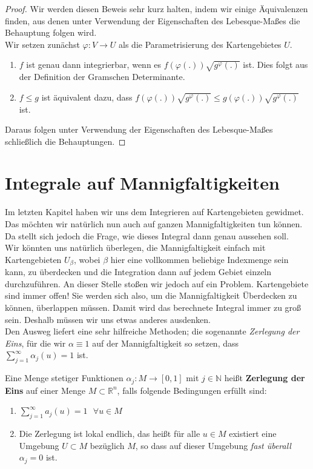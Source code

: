 \newpage
\begin{proof}
	Wir werden diesen Beweis sehr kurz halten, indem wir einige 
	Äquivalenzen finden, aus denen unter Verwendung der Eigenschaften 
	des Lebesque-Maßes die Behauptung folgen wird.\\
	Wir setzen zunächst $\varphi:V\rightarrow U$ als die Parametrisierung 
	des	Kartengebietes $U$. 
	\begin{enumerate}
		\item 	$f$ ist genau dann integrierbar, wenn es 
				$f\left(\varphi(.)\right)\sqrt{g^\varphi(.)}$ ist. 
				Dies folgt aus 	der Definition der Gramschen Determinante. 
		\item 	$f\leq g$ ist äquivalent dazu, dass 
				$f\left(\varphi(.)\right)\sqrt{g^\varphi(.)} \leq 
				g\left(\varphi(.)\right)\sqrt{g^\varphi(.)}$ ist.
	\end{enumerate}
	Daraus folgen unter Verwendung der Eigenschaften des Lebesque-Maßes 
	schließlich die Behauptungen. 
\end{proof}

\section{Integrale auf Mannigfaltigkeiten}

Im letzten Kapitel haben wir uns dem Integrieren auf Kartengebieten 
gewidmet. Das möchten wir natürlich nun auch auf ganzen Mannigfaltigkeiten 
tun können. Da stellt sich jedoch die Frage, wie dieses Integral dann 
genau aussehen soll. \\
Wir könnten uns natürlich überlegen, die Mannigfaltigkeit einfach 
mit Kartengebieten $U_\beta$, wobei $\beta$ hier eine vollkommen 
beliebige Indexmenge sein kann, zu überdecken und die Integration 
dann auf jedem Gebiet einzeln durchzuführen. An dieser Stelle stoßen 
wir jedoch auf ein Problem. Kartengebiete sind immer offen! Sie 
werden sich also, um die Mannigfaltigkeit Überdecken zu können, 
überlappen müssen. Damit wird das berechnete Integral immer zu 
groß sein. Deshalb müssen wir uns etwas anderes ausdenken.\\
\linebreak
Den Ausweg liefert eine sehr hilfreiche Methoden; die sogenannte 
\emph{Zerlegung der Eins}, für die wir $\alpha\equiv 1$ auf der 
Mannigfaltigkeit so setzen, dass $\sum\limits_{j=1}^\infty \alpha_j(u)=1$ ist.

\begin{definition}
	Eine Menge stetiger Funktionen $\alpha_j:M\rightarrow [0,1]$ 
	mit $j\in\mathbb{N}$ heißt \textbf{Zerlegung der Eins} auf 
	einer Menge $M\subset\mathbb{R}^n$, falls folgende Bedingungen 
	erfüllt sind:
	\begin{enumerate}
		\item 	$\sum\limits_{j=1}^\infty a_j(u) = 1   \ \ \ \forall u\in M$
		\item 	Die Zerlegung ist lokal endlich, das heißt für alle 
				$u\in M$ existiert eine Umgebung $U\subset M$ bezüglich 
				$M$, so dass auf dieser Umgebung \emph{fast überall} 
				$\alpha_j=0$ ist.
	\end{enumerate}
\end{definition}

